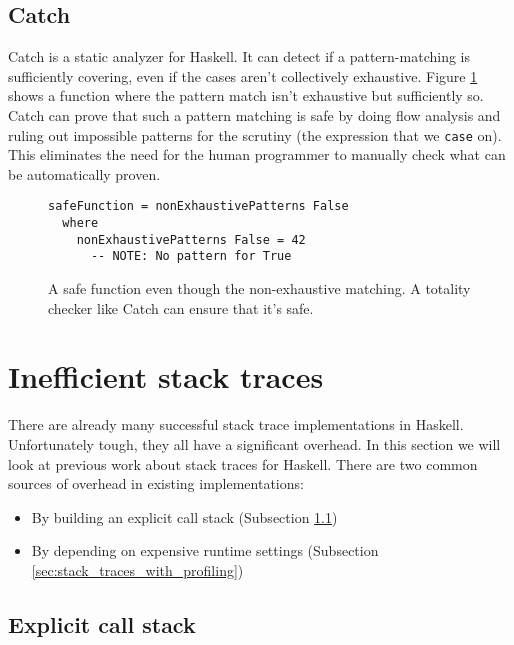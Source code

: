 \subsection{Catch}

Catch is a static analyzer for Haskell. It can detect if a pattern-matching is
sufficiently covering, even if the cases aren't collectively exhaustive. Figure
\ref{fig:catch_example} shows a function where the pattern match isn't exhaustive but
sufficiently so.
Catch can prove that such a pattern
matching is safe by doing flow analysis and ruling out impossible
patterns for the scrutiny (the expression that we \texttt{case} on).
This eliminates the need for the human programmer to manually check what can be
automatically proven. \cite{mitchell:catch_2008_9_25}

\begin{figure}
\begin{mdframed}
      \begin{verbatim}
safeFunction = nonExhaustivePatterns False
  where
    nonExhaustivePatterns False = 42
      -- NOTE: No pattern for True
      \end{verbatim}
      \caption{A safe function even though the non-exhaustive matching. A
        totality checker like Catch can ensure that it's safe.}
      \label{fig:catch_example}
\end{mdframed}
\end{figure}

\section{Inefficient stack traces} \label{sec:overhead_full}

There are already many successful stack trace implementations in
Haskell. Unfortunately tough, they all have a significant overhead.
In this section we will look at previous work about stack traces for
Haskell. There are two common sources of overhead in existing implementations:

\begin{itemize}
\itemsep1pt\parskip0pt
\item
  By building an explicit call stack (Subsection \ref{sec:explicit_call_stack})
\item
  By depending on expensive runtime settings (Subsection \ref{sec:stack_traces_with_profiling})
\end{itemize}

\subsection{Explicit call stack} \label{sec:explicit_call_stack}

